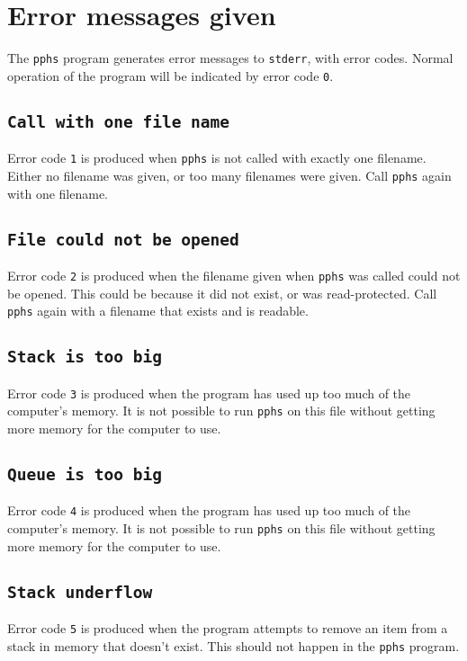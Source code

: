 \chapter{Error messages given}

The {\tt pphs} program generates error messages to {\tt stderr},
with error codes.  Normal operation of the program will be
indicated by error code {\tt 0}.

\section{\tt Call with one file name}

Error code {\tt 1} is produced when {\tt pphs} is not called with
exactly one filename.  Either no filename was given, or too many
filenames were given.  Call {\tt pphs} again with one filename.

\section{\tt File could not be opened}

Error code {\tt 2} is produced when the filename given when {\tt pphs}
was called could not be opened.  This could be because it did not exist,
or was read-protected.  Call {\tt pphs} again with a filename that exists
and is readable.

\section{\tt Stack is too big}

Error code {\tt 3} is produced when the program has used up too much of
the computer's memory.  It is not possible to run {\tt pphs} on this file
without getting more memory for the computer to use.

\section{\tt Queue is too big}

Error code {\tt 4} is produced when the program has used up too much of
the computer's memory.  It is not possible to run {\tt pphs} on this file
without getting more memory for the computer to use.

\section{\tt Stack underflow}

Error code {\tt 5} is produced when the program attempts to remove an item
from a stack in memory that doesn't exist.  This should not happen in the
{\tt pphs} program.

